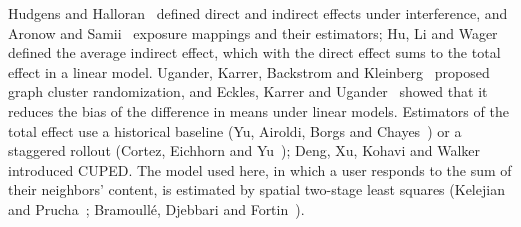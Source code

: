 \documentclass[final,5p,times,twocolumn,number]{elsarticle}
\begin{document}
Hudgens and Halloran~\cite{r13} defined direct and indirect effects under interference, and Aronow and Samii~\cite{r1} exposure mappings and their estimators; Hu, Li and Wager~\cite{r12} defined the average indirect effect, which with the direct effect sums to the total effect in a linear model. Ugander, Karrer, Backstrom and Kleinberg~\cite{r21} proposed graph cluster randomization, and Eckles, Karrer and Ugander~\cite{r8} showed that it reduces the bias of the difference in means under linear models. Estimators of the total effect use a historical baseline (Yu, Airoldi, Borgs and Chayes~\cite{r25}) or a staggered rollout (Cortez, Eichhorn and Yu~\cite{r6}); Deng, Xu, Kohavi and Walker~\cite{r7} introduced CUPED. The model used here, in which a user responds to the sum of their neighbors' content, is estimated by spatial two-stage least squares (Kelejian and Prucha~\cite{r16}; Bramoullé, Djebbari and Fortin~\cite{r4}).
\end{document}
